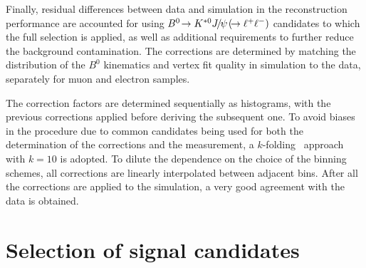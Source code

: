 \documentclass[12pt,a4paper]{article}
\def\Ppsi        {\ensuremath{\uppsi}\xspace}
\def\PB      {\ensuremath{\mathrm{B}}\xspace}
\def\PJ      {\ensuremath{\mathrm{J}}\xspace}
\def\PK      {\ensuremath{\mathrm{K}}\xspace}
\def\Ppsi        {\ensuremath{\psi}\xspace}
\def\PB      {\ensuremath{B}\xspace}
\def\PJ      {\ensuremath{J}\xspace}
\def\PK      {\ensuremath{K}\xspace}
\def\ellm       {\ensuremath{\ell^-}\xspace}
\def\ellp       {\ensuremath{\ell^+}\xspace}
\def\kaon  {\ensuremath{\PK}\xspace}
\def\Kstarz  {\ensuremath{\kaon^{*0}}\xspace}
\def\B       {\ensuremath{\PB}\xspace}
\def\Bz      {\ensuremath{\B^0}\xspace}
\def\Bd      {\ensuremath{\B^0}\xspace}
\def\jpsi     {\ensuremath{{\PJ\mskip -3mu/\mskip -2mu\Ppsi\mskip 2mu}}\xspace}
\newcommand{\decay}[2]{\ensuremath{#1\!\to #2}\xspace}         \def\ra                 {\ensuremath{\rightarrow}\xspace}
\def\to                 {\ensuremath{\rightarrow}\xspace}
\def\ll{\ensuremath{\ellp\ellm}\xspace}
\def\BdToKstJPsll{\mbox{\decay{\Bd}{\Kstarz \jpsi(\decay{}{\ll})}}\xspace}
\begin{document}
Finally, residual differences between data and simulation in the reconstruction performance are accounted for using \BdToKstJPsll candidates to which the full selection is applied, as well as additional requirements to further reduce the background contamination. 
The corrections are determined by matching the distribution of the \Bz kinematics and vertex fit quality in simulation to the data, separately for muon and electron samples. 

The correction factors are determined sequentially as histograms, with the previous corrections applied before deriving the subsequent one.
To avoid biases in the procedure due to common candidates being used for both the determination of the corrections and the measurement, a $k$-folding~\cite{Blum:1999:BHB:307400.307439} approach with $k = 10$ is adopted.
To dilute the dependence on the choice of the binning schemes, all corrections are linearly interpolated between adjacent bins.
After all the corrections are applied to the simulation, a very good agreement with the data is obtained.

 
\section{Selection of signal candidates}
\label{sec:selection}
\end{document}
